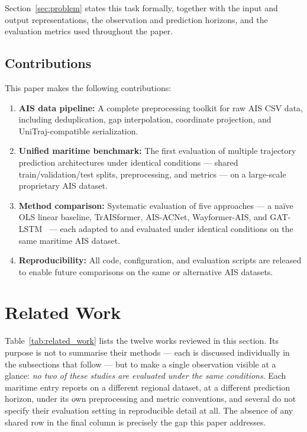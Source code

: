 \documentclass[12pt, a4paper]{article}
\begin{document}
  Section~\ref{sec:problem} states this task formally, together with the input
  and output representations, the observation and prediction horizons, and the
  evaluation metrics used throughout the paper.

  \subsection{Contributions}
  This paper makes the following contributions:
  \begin{enumerate}
      \item \textbf{AIS data pipeline:} A complete pre\-processing toolkit for raw
      AIS CSV data, including de\-duplication, gap interpolation, coordinate
      projection, and UniTraj-com\-pat\-i\-ble serialization.

      \item \textbf{Unified maritime benchmark:} The first evaluation of multiple trajectory
      prediction architectures under identical conditions --- shared train/validation/test splits,
      preprocessing, and metrics --- on a large-scale proprietary AIS dataset.

      \item \textbf{Method comparison:} Systematic evaluation of five approaches ---
      a na\"{i}ve OLS linear baseline, TrAISformer, AIS-ACNet,
      Wayformer-AIS, and GAT-LSTM~\citep{zhao2023gatlstm} --- each adapted to
      and evaluated under identical conditions on the same maritime AIS dataset.

      \item \textbf{Reproducibility:} All code, configuration, and evaluation scripts
      are released to enable future comparisons on the same or alternative AIS datasets.
  \end{enumerate}

  \section{Related Work}
  \label{sec:related}

  Table~\ref{tab:related_work} lists the twelve works reviewed in this section.
  Its purpose is not to summarise their methods --- each is discussed individually
  in the subsections that follow --- but to make a single observation visible at a
  glance: \emph{no two of these studies are evaluated under the same conditions}.
  Each maritime entry reports on a different regional dataset, at a different
  prediction horizon, under its own preprocessing and metric conventions, and
  several do not specify their evaluation setting in reproducible detail at all.
  The absence of any shared row in the final column is precisely the gap this
  paper addresses.
\end{document}

